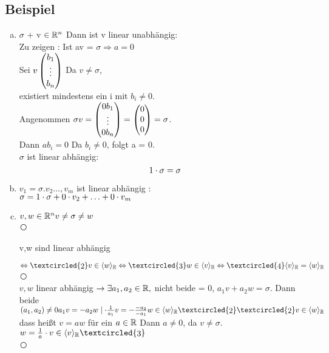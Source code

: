 \subsection{Beispiel}\label{sec:0.10}
\begin{enumerate}[a)]
\item $\sigma$ + v $\in \mathbb{R}^n$ Dann ist v linear unabhängig:\\
Zu zeigen : Ist av = $\sigma \Rightarrow a = 0$\\
Sei $v \begin{pmatrix} b_1\\\vdots\\b_n \end{pmatrix}$ Da $v\ne \sigma$,\\
existiert mindestens ein i mit $b_i \ne 0$.\\
Angenommen $\sigma v = \begin{pmatrix} 0 b_1\\\vdots\\0 b_n \end{pmatrix} = \begin{pmatrix} 0\\0\\0 \end{pmatrix} = \sigma $. \\
Dann $ab_i = 0$ Da $b_i \ne 0$, folgt a = 0.\\
$\sigma$ ist linear abhängig: \[1 \cdot \sigma = \sigma \]
\item $v_1 = \sigma .v_2\ldots,v_m$ ist linear abhängig :\\
$\sigma = 1 \cdot \sigma + 0 \cdot v_2 + \ldots + 0 \cdot v_m$
\item $v,w \in \mathbb{R}^n\\
v \ne \sigma \ne w$\\
\textcircled{\raisebox{-1pt}{1}}\parbox{.2\textwidth}{v,w sind linear abhängig} $\Leftrightarrow\\
\textcircled{\raisebox{-1pt}{2}} v \in \langle w \rangle_\R \Leftrightarrow\\
\textcircled{\raisebox{-1pt}{3}} w \in \langle v \rangle_\R \Leftrightarrow\\
\textcircled{\raisebox{-1pt}{4}} \langle v \rangle_\R = \langle w \rangle_\R$\\
\textcircled{\raisebox{-1pt}{1}}\\
$v,w$ linear abhängig $\rightarrow \exists a_1,a_2\in \mathbb{R},$ nicht beide = 0, $a_1v + a_2w = \sigma$. Dann beide $(a_1,a_2) \ne 0\\
a_1v = -a_2w \mid \cd \frac1{a_1}\\
v = - \frac{-a_2}{-a_1}w \in \langle w \rangle_\R  \textcircled{\raisebox{-1pt}{2}}\\
\textcircled{\raisebox{-1pt}{2}}\\
v \in \langle w \rangle_\R$ dass hei\ss t $v = aw$ für ein $a \in \mathbb{R}$ Dann $a \ne 0$, da $v \ne \sigma$. $w = \frac1a \cd v \in \langle v \rangle_\R \textcircled{\raisebox{-1pt}{3}}$\\
\textcircled{\raisebox{-1pt}{3}}\\

\end{enumerate}
